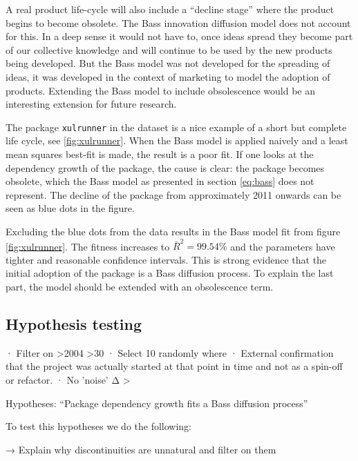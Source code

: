\documentclass[smallextended,final]{svjour3}
\begin{document}
A real product life-cycle will also include a ``decline stage'' where the product begins to become obsolete. The Bass innovation diffusion model does not account for this. In a deep sense it would not have to, once ideas spread they become part of our collective knowledge and will continue to be used by the new products being developed. But the Bass model was not developed for the spreading of ideas, it was developed in the context of marketing to model the adoption of products. Extending the Bass model to include obsolescence would be an interesting extension for future research.

The package \verb|xulrunner| in the dataset is a nice example of a short but complete life cycle, see \ref{fig:xulrunner}. When the Bass model is applied naively and a least mean squares best-fit is made, the result is a poor fit. If one looks at the dependency growth of the package, the cause is clear: the package becomes obsolete, which the Bass model as presented in section \ref{eq:bass} does not represent. The decline of the package from approximately 2011 onwards can be seen as blue dots in the figure.

Excluding the blue dots from the data results in the Bass model fit from figure \ref{fig:xulrunner}. The fitness increases to $\bar{R}^2=99.54\%$ and the parameters have tighter and reasonable confidence intervals. This is strong evidence that the initial adoption of the package is a Bass diffusion process. To explain the last part, the model should be extended with an obsolescence term. 


\subsection{Hypothesis testing}

· Filter on >2004  >30
· Select 10 randomly where
	· External confirmation that the project was actually started at that point in time and not as a spin-off or refactor.
	· No 'noise' Δ > 

Hypotheses: “Package dependency growth fits a Bass diffusion process”

To test this hypotheses we do the following: 

→ Explain why discontinuities are unnatural and filter on them
\end{document}
